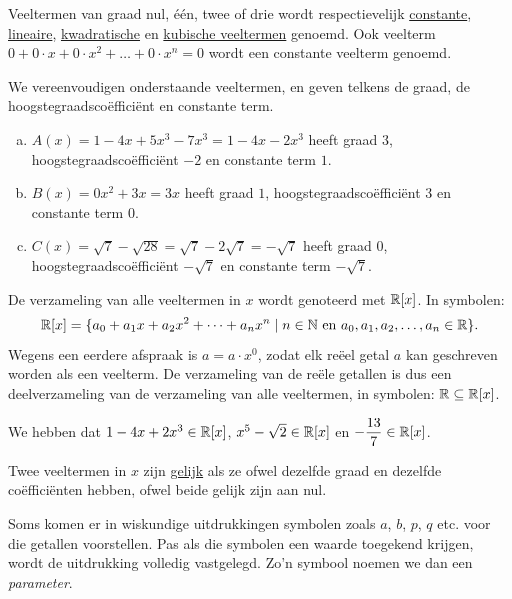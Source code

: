 \documentclass{ximera}
\begin{document}
Veeltermen van graad nul, \'e\'en, twee of drie wordt respectievelijk \underline{constante}, \underline{lineaire}, \linebreak \underline{kwadratische} en \underline{kubische veeltermen} genoemd. Ook veelterm $0 + 0\cdot x + 0 \cdot x^2 + \dots + 0\cdot x^n = 0$ wordt een constante veelterm genoemd.

\begin{example} 
We vereenvoudigen onderstaande veeltermen, en geven telkens de graad, de hoogstegraadsco\"effici\"ent en constante term.
\begin{enumerate}[(a)]
\item
$A(x) = 1-4x+5x^3-7x^3 = 1 - 4x - 2x^3$ heeft graad $3$, hoogstegraadsco\"effici\"ent $-2$ en constante term $1$.
\item
$B(x) = 0x^2 + 3x = 3x$ heeft graad $1$, hoogstegraadsco\"effici\"ent $3$ en constante term $0$.
\item
$C(x) = \sqrt{7}-\sqrt{28} = \sqrt{7}-2\sqrt{7} = -\sqrt{7}$ heeft graad $0$, hoogstegraadsco\"effici\"ent $-\sqrt{7}$ en constante term $-\sqrt{7}$.
\end{enumerate}
\end{example} 

De verzameling van alle veeltermen in $x$ wordt genoteerd met $\mathbb{R}[x]$. In symbolen:
\[
\mathbb{R}[x] = \{a_0 + a_1 x + a_2 x^2 + \dots + a_n x^n \mid \text{$n \in \mathbb{N}$ en $a_0,a_1,a_2,\ldots,a_n \in \mathbb{R}$} \}.
\]
Wegens een eerdere afspraak is $a = a\cdot x^0$, zodat elk re\"eel getal $a$ kan geschreven worden als een veelterm. De verzameling van de re\"ele getallen is dus een deelverzameling
van de verzameling van alle veeltermen, in symbolen: $\mathbb{R} \subseteq \mathbb{R}[x]$. 

\begin{example} 
We hebben dat $1-4x+2x^3 \in \mathbb{R}[x]$, $x^5-\sqrt{2} \in \mathbb{R}[x]$ en $\displaystyle -\frac{13}{7} \in \mathbb{R}[x]$.   
\end{example} 

Twee veeltermen in $x$ zijn \underline{gelijk} als ze ofwel dezelfde graad en dezelfde co\"effici\"enten hebben, ofwel beide gelijk zijn aan nul. 

Soms komen er in wiskundige uitdrukkingen symbolen zoals $a$, $b$, $p$, $q$ etc. voor die getallen voorstellen. Pas als die symbolen een waarde toegekend krijgen, wordt de uitdrukking volledig vastgelegd. Zo'n symbool noemen we dan een {\em parameter}. 
\end{document}
